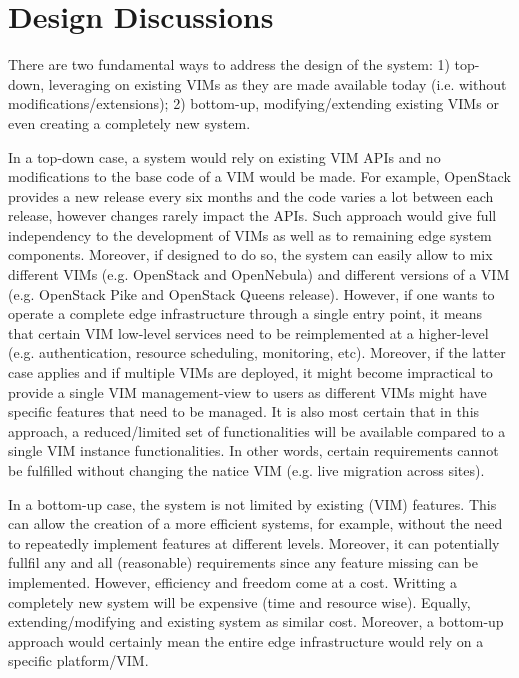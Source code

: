 


\section{Design Discussions}
\label{sec:design_discussion}

There are two fundamental ways to address the design of the system: 1) top-down, leveraging on existing VIMs as they are made available today (i.e. without modifications/extensions); 2) bottom-up, modifying/extending existing VIMs or even creating a completely new system. 

In a top-down case, a system  would rely on existing VIM APIs and no modifications to the base code of a VIM would be made. For example, OpenStack provides a new release every six months and the code varies a lot between each release, however changes rarely impact the APIs. Such approach would give full independency to the development of VIMs as well as to remaining edge system components. Moreover, if designed to do so, the system can easily allow to mix different VIMs (e.g. OpenStack and OpenNebula) and different versions of a VIM (e.g. OpenStack Pike and OpenStack Queens release). 
However, if one wants to operate a complete edge infrastructure through a single entry point, it means that certain VIM low-level services need to be reimplemented at a higher-level (e.g. authentication, resource scheduling, monitoring, etc). Moreover, if the latter case applies and if multiple VIMs are deployed, it might become impractical to provide a single VIM management-view to users as different VIMs might have specific features that need to be managed. It is also most certain that in this approach, a reduced/limited set of functionalities will be available compared to a single VIM instance functionalities. In other words, certain requirements cannot be fulfilled without changing the natice VIM (e.g. live migration across sites).


In a bottom-up case, the system is not limited by existing (VIM) features. This can allow the creation of a more efficient systems, for example, without the need to repeatedly implement features at different levels. Moreover, it can potentially fullfil any and all (reasonable) requirements since any feature missing can be implemented. 
However, efficiency and freedom come at a cost. Writting a completely new system will be expensive (time and resource wise). Equally, extending/modifying and existing system as similar cost. Moreover, a bottom-up approach would certainly mean the entire edge infrastructure would rely on a specific platform/VIM. 


